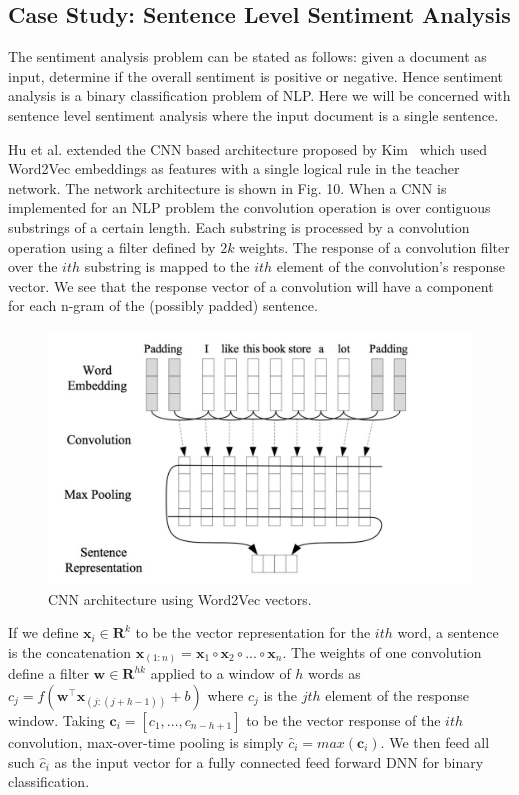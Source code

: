 \documentclass[11pt]{article}
\begin{document}
\subsection{Case Study: Sentence Level Sentiment Analysis}
The sentiment analysis problem can be stated as follows: given a document as input, determine if the overall sentiment is positive or negative.  Hence sentiment analysis is a binary classification problem of NLP.  Here we will be concerned with sentence level sentiment analysis where the input document is a single sentence.

Hu et al. extended the CNN based architecture proposed by Kim~\cite{Kim2014ConvolutionalNN} which used Word2Vec embeddings as features with a single logical rule in the teacher network.  The network architecture is shown in Fig. 10.  When a CNN is implemented for an NLP problem the convolution operation is over contiguous substrings of a certain length.  Each substring is processed by a convolution operation using a filter defined by $2k$ weights.  The response of a convolution filter over the $ith$ substring is mapped to the $ith$ element of the convolution's response vector.  We see that the response vector of a convolution will have a component for each n-gram of the (possibly padded) sentence.

\begin{figure}
	\begin{center}
		\includegraphics[width=13.25cm, height=6.75cm]{cnn}
		\caption{CNN architecture using Word2Vec vectors.}
	\end{center}
\end{figure}

If we define $\textbf{x}_i \in \mathbf{R}^k$ to be the vector representation for the $ith$ word, a sentence is the concatenation $\textbf{x}_{(1:n)} = \textbf{x}_{1} \circ \textbf{x}_{2} \circ ... \circ \textbf{x}_{n}$.  The weights of one convolution define a filter $\textbf{w} \in \mathbf{R}^{hk}$ applied to a window of $h$ words as $c_j = f(\textbf{w}^{\top} \textbf{x}_{(j:(j + h - 1))} + b)$ where $c_j$ is the $jth$ element of the response window.  Taking $\textbf{c}_i = [c_1, ..., c_{n - h + 1}]$ to be the vector response of the $ith$ convolution, max-over-time pooling is simply $\hat{c}_i = max(\textbf{c}_i)$.  We then feed all such $\hat{c}_i$ as the input vector for a fully connected feed forward DNN for binary classification.
\end{document}
